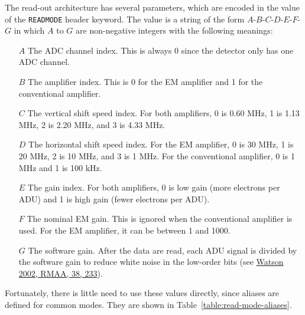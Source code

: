 The read-out architecture has several parameters, which are encoded in the value of the \verb|READMODE| header keyword. The value is a string of the form $A$-$B$-$C$-$D$-$E$-$F$-$G$ in which $A$ to $G$ are non-negative integers with the following meanings:

\begin{itemize}
\item[$A$] The ADC channel index. This is always 0 since the detector only has one ADC channel.
\item[$B$] The amplifier index. This is 0 for the EM amplifier and 1 for the conventional amplifier.
\item[$C$] The vertical shift speed index. For both amplifiers, 0 is 0.60 MHz, 1 is 1.13 MHz, 2 is 2.20 MHz, and 3 is 4.33 MHz. 
\item[$D$] The horizontal shift speed index. For the EM amplifier, 0 is 30 MHz, 1 is 20 MHz, 2 is 10 MHz, and 3 is 1 MHz. For the conventional amplifier, 0 is 1 MHz and 1 is 100 kHz.
\item[$E$] The gain index. For both amplifiers, 0 is low gain (more electrons per ADU) and 1 is high gain (fewer electrons per ADU).
\item[$F$] The nominal EM gain. This is ignored when the conventional amplifier is used. For the EM amplifier, it can be between 1 and 1000.
\item[$G$] The software gain. After the data are read, each ADU signal is divided by the software gain to reduce white noise in the low-order bits (see \href{https://ui.adsabs.harvard.edu/abs/2002RMxAA..38..233W/abstract}{Watson 2002, RMAA, 38, 233}).
\end{itemize}

Fortunately, there is little need to use these values directly, since aliases are defined for common modes. They are shown in Table~\ref{table:read-mode-aliases}.

